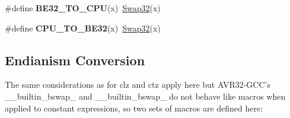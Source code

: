 \begin{DoxyCompactItemize}
\item 
\hypertarget{group__group__xmega__utils_gad6fd2e5e0a54fb6300fe98868141175e}{\#define {\bfseries B\-E32\-\_\-\-T\-O\-\_\-\-C\-P\-U}(x)~\hyperlink{group__group__xmega__utils_ga5e9bc2e3b3e43eadc3210b02cab6ac64}{Swap32}(x)}\label{group__group__xmega__utils_gad6fd2e5e0a54fb6300fe98868141175e}

\item 
\hypertarget{group__group__xmega__utils_gabe5b68e77b7f6870895076278368d201}{\#define {\bfseries C\-P\-U\-\_\-\-T\-O\-\_\-\-B\-E32}(x)~\hyperlink{group__group__xmega__utils_ga5e9bc2e3b3e43eadc3210b02cab6ac64}{Swap32}(x)}\label{group__group__xmega__utils_gabe5b68e77b7f6870895076278368d201}

\end{DoxyCompactItemize}
\subsection*{Endianism Conversion}
\label{_amgrpdbefbc0e3fd569bb2d3a4f2dd9915efb}%
 The same considerations as for clz and ctz apply here but A\-V\-R32-\/\-G\-C\-C's \-\_\-\-\_\-builtin\-\_\-bswap\-\_ and \-\_\-\-\_\-builtin\-\_\-bswap\-\_ do not behave like macros when applied to constant expressions, so two sets of macros are defined here\-:

